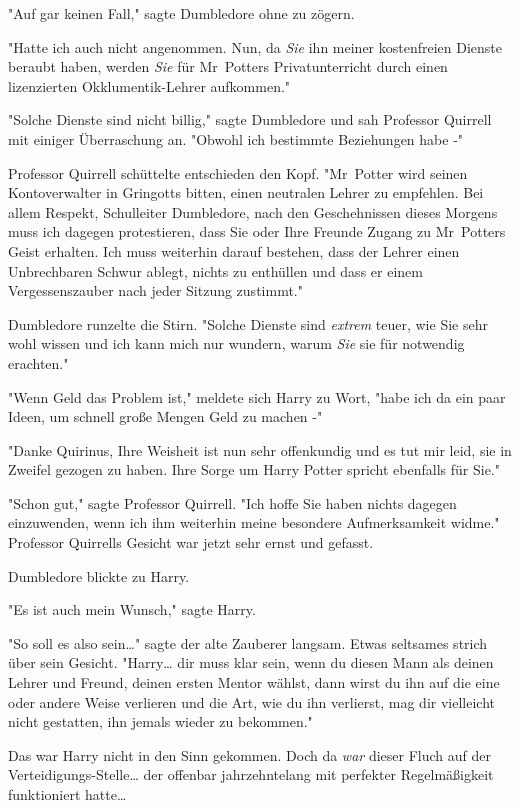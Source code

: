 {"Auf gar keinen Fall," sagte Dumbledore ohne zu zögern.

"Hatte ich auch nicht angenommen. Nun, da \emph{Sie} ihn meiner kostenfreien Dienste beraubt haben, werden \emph{Sie} für Mr~Potters Privatunterricht durch einen lizenzierten Okklumentik-Lehrer aufkommen."

"Solche Dienste sind nicht billig," sagte Dumbledore und sah Professor Quirrell mit einiger Überraschung an. "Obwohl ich bestimmte Beziehungen habe -"

Professor Quirrell schüttelte entschieden den Kopf. "Mr~Potter wird seinen Kontoverwalter in Gringotts bitten, einen neutralen Lehrer zu empfehlen. Bei allem Respekt, Schulleiter Dumbledore, nach den Geschehnissen dieses Morgens muss ich dagegen protestieren, dass Sie oder Ihre Freunde Zugang zu Mr~Potters Geist erhalten. Ich muss weiterhin darauf bestehen, dass der Lehrer einen Unbrechbaren Schwur ablegt, nichts zu enthüllen und dass er einem Vergessenszauber nach jeder Sitzung zustimmt."

Dumbledore runzelte die Stirn. "Solche Dienste sind \emph{extrem} teuer, wie Sie sehr wohl wissen und ich kann mich nur wundern, warum \emph{Sie} sie für notwendig erachten."

"Wenn Geld das Problem ist," meldete sich Harry zu Wort, "habe ich da ein paar Ideen, um schnell große Mengen Geld zu machen -"

"Danke Quirinus, Ihre Weisheit ist nun sehr offenkundig und es tut mir leid, sie in Zweifel gezogen zu haben. Ihre Sorge um Harry Potter spricht ebenfalls für Sie."

"Schon gut," sagte Professor Quirrell. "Ich hoffe Sie haben nichts dagegen einzuwenden, wenn ich ihm weiterhin meine besondere Aufmerksamkeit widme." Professor Quirrells Gesicht war jetzt sehr ernst und gefasst.

Dumbledore blickte zu Harry.

"Es ist auch mein Wunsch," sagte Harry.

"So soll es also sein…" sagte der alte Zauberer langsam. Etwas seltsames strich über sein Gesicht. "Harry… dir muss klar sein, wenn du diesen Mann als deinen Lehrer und Freund, deinen ersten Mentor wählst, dann wirst du ihn auf die eine oder andere Weise verlieren und die Art, wie du ihn verlierst, mag dir vielleicht nicht gestatten, ihn jemals wieder zu bekommen."

Das war Harry nicht in den Sinn gekommen. Doch da \emph{war} dieser Fluch auf der Verteidigungs-Stelle… der offenbar jahrzehntelang mit perfekter Regelmäßigkeit funktioniert hatte…

}
